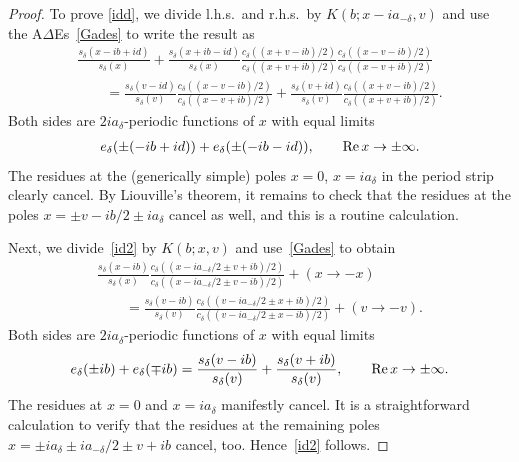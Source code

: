 \documentclass[11pt]{article}
\numberwithin{equation}{section}
\newcommand{\De}{\Delta}
\newcommand{\de}{\delta}
\newcommand{\re}{{\rm Re}\, }
\begin{document}
\begin{proof}
To prove \eqref{idd}, we divide l.h.s.\ and r.h.s.\ by $K(b;x-ia_{-\de},v)$ and use the A$\De$Es~\eqref{Gades} to write the result as
\begin{gather}
  \frac{s_{\de}(x-ib+id)}{s_{\de}(x)}+\frac{s_{\de}(x+ib-id)}{s_{\de}(x)}\frac{c_{\de}((x+ v-ib)/2)}{c_{\de}((x+ v+ib)/2)}\frac{c_{\de}((x- v-ib)/2)}{c_{\de}((x- v+ib)/2)}  \nonumber \\
\qquad{} = \frac{s_{\de}(v-id)}{s_{\de}(v)} \frac{c_{\de}((x-v-ib)/2)}{c_{\de}((x-v+ib)/2)} +   \frac{s_{\de}(v+id)}{s_{\de}(v)} \frac{c_{\de}((x+v-ib)/2)}{c_{\de}((x+v+ib)/2)}.\label{idq}
\end{gather}
Both sides are $2ia_{\de}$-periodic functions of $x$ with equal limits
\begin{gather}
e_{\de}(\pm (-ib+id))+e_{\de}(\pm (-ib-id)),\qquad \re x \to\pm\infty.
\end{gather}
The residues at the (generically simple) poles $x=0$, $x=ia_{\de}$ in the period strip clearly cancel. By Liouville's theorem, it remains to check that the residues at the poles $x=\pm v -ib/2\pm ia_{\de}$ cancel as well, and this is a routine calculation.

Next, we divide~\eqref{id2} by $K(b;x,v)$ and use~\eqref{Gades} to obtain
\begin{gather}
  \frac{s_{\de}(x-ib)}{s_{\de}(x)}\frac{c_{\de}((x-ia_{-\de}/2\pm v +ib)/2)}{c_{\de}((x-ia_{-\de}/2\pm v -ib)/2)}+ (x\to -x)
\nonumber \\
\qquad{} = \frac{s_{\de}(v-ib)}{s_{\de}(v)} \frac{c_{\de}((v-ia_{-\de}/2\pm x +ib)/2)}{c_{\de}((v-ia_{-\de}/2\pm x -ib)/2)}+ (v\to -v).
\end{gather}
Both sides are $2ia_{\de}$-periodic functions of $x$ with equal limits
\begin{gather}
e_{\de}(\pm ib)+e_{\de}(\mp ib)=\frac{s_{\de}(v-ib)}{s_{\de}(v)} +\frac{s_{\de}(v+ib)}{s_{\de}(v)},\qquad \re x \to\pm\infty.
\end{gather}
The residues at $x=0$ and $x=ia_{\de}$ manifestly cancel. It is a straightforward calculation to verify that the residues at the remaining poles $x=\pm ia_{\de}\pm ia_{-\de}/2\pm v +ib$ cancel, too. Hence~\eqref{id2} follows.


\end{proof}
\end{document}

